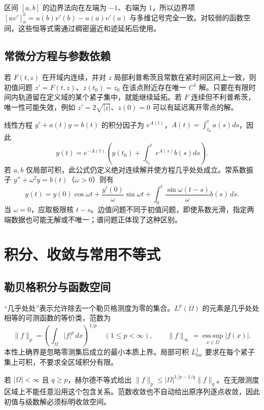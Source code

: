 \documentclass[UTF8,12pt,a4paper,fontset=fandol]{ctexbook}
\begin{document}
区间 $[a,b]$ 的边界法向在左端为 $-1$、右端为 $1$，所以边界项 $[uv']_a^b=u(b)v'(b)-u(a)v'(a)$ 与多维记号完全一致。对较弱的函数空间，这些恒等式需通过稠密逼近和迹延拓后使用。

\section{常微分方程与参数依赖}
若 $F(t,z)$ 在开域内连续，并对 $z$ 局部利普希茨且常数在紧时间区间上一致，则初值问题 $z'=F(t,z)$、$z(t_0)=z_0$ 在该点附近存在唯一 $C^1$ 解。只要在有限时间内轨道留在定义域的某个紧子集中，就能继续延拓。若 $F$ 连续但不利普希茨，唯一性可能失效，例如 $z'=2\sqrt{|z|}$、$z(0)=0$ 可以有延迟离开零点的解。

线性方程 $y'+a(t)y=b(t)$ 的积分因子为 $e^{A(t)}$，$A(t)=\int_{t_0}^t a(s)ds$，因此
\[
 y(t)=e^{-A(t)}\left(y(t_0)+\int_{t_0}^t e^{A(s)}b(s)ds\right).
\]
若 $a,b$ 仅局部可积，此公式仍定义绝对连续解并使方程几乎处处成立。常系数振子 $y''+\omega^2y=b(t)$（$\omega>0$）则有
\[
 y(t)=y(0)\cos\omega t+\frac{y'(0)}\omega\sin\omega t
       +\int_0^t\frac{\sin\omega(t-s)}\omega b(s)\,ds.
\]
当 $\omega=0$，应取极限核 $t-s$。边值问题不同于初值问题，即使系数光滑，指定两端数据也可能无解或不唯一；谱问题正体现了这种区别。

\chapter{积分、收敛与常用不等式}
\label{app:analysis}

\section{勒贝格积分与函数空间}
“几乎处处”表示允许除去一个勒贝格测度为零的集合。$L^p(\Omega)$ 的元素是几乎处处相等的可测函数的等价类，范数为
\[
 \|f\|_p=\left(\int_\Omega|f|^p\,dx\right)^{1/p}\quad(1\le p<\infty),\qquad
 \|f\|_\infty=\operatorname*{ess\,sup}_{x\in\Omega}|f(x)|.
\]
本性上确界是忽略零测集后成立的最小本质上界。局部可积 $L^1_{\mathrm{loc}}$ 要求在每个紧子集上可积，不要求全区域积分有限。

若 $|\Omega|<\infty$ 且 $q\ge p$，赫尔德不等式给出 $\|f\|_p\le|\Omega|^{1/p-1/q}\|f\|_q$。在无限测度区域上不能任意沿用这个包含关系。范数收敛也不自动给出原序列逐点收敛，因此初值与级数解必须标明收敛空间。
\end{document}
